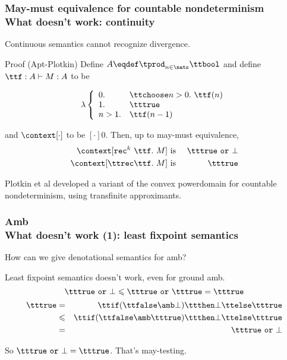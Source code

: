 \documentclass{beamer}
\newcommand{\ttor}{\ \mathtt{or}\ }
\newcommand{\recapp}[3]{\mathtt{rec}^{{#1}}\ {#2}}
\begin{document}
\begin{frame}\frametitle{May-must equivalence for countable nondeterminism \\ What doesn't work: continuity}

Continuous semantics cannot recognize divergence.

\begin{block}{Proof (Apt-Plotkin)}
  Define $A \eqdef  \tprod_{n \in \nats}\ttbool$ and define $\ttf:A \vdash M : A$ to be

\begin{displaymath}
 \lambda \left\{
    \begin{array}{ll}
0. & \ttchoose n>0.\ \ttf(n) \\
1. & \tttrue \\
n >1. & \ttf(n-1)
    \end{array} \right.
\end{displaymath}

and $\context[\cdot]$ to be $[\cdot]0$.  Then, up to may-must equivalence,
\begin{eqnarray*}
  \context[\recapp{k}{\ttf.\ M}{\bot}{}]{} & \mbox{ is } & \tttrue \ttor \bot \\
  \context[\ttrec \ttf.\ M] & \mbox{ is } & \tttrue 
\end{eqnarray*}
\end{block}

Plotkin et al developed a variant of the convex powerdomain for countable nondeterminism, using transfinite approximants.

  
\end{frame}

\begin{frame}\frametitle{Amb \\  What doesn't work (1): least fixpoint semantics}
  
How can we give denotational semantics for amb? \\
\medskip

Least fixpoint semantics doesn't work, even for ground amb. \\

\begin{displaymath}
    \tttrue \ttor \bot \leqslant  \tttrue \ttor \tttrue 
  =  \tttrue
\end{displaymath}
\begin{eqnarray*}
  \tttrue & = & \ttif (\ttfalse \amb \bot) \ttthen \bot \ttelse \tttrue \\
 & \leqslant & \ttif (\ttfalse \amb \tttrue) \ttthen \bot \ttelse \tttrue \\
 & = & \tttrue \ttor \bot
\end{eqnarray*}

So $\tttrue \ttor \bot = \tttrue$.  That's may-testing.

\end{frame}
\end{document}
